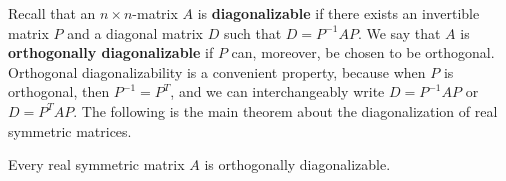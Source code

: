 \documentclass{ximera}
\begin{document}
Recall that an $n\times n$-matrix $A$ is \textbf{diagonalizable} if there exists an invertible matrix $P$
and a diagonal matrix $D$ such that $D = P^{-1}AP$. We say that $A$ is \textbf{orthogonally diagonalizable} if $P$ can, moreover, be
chosen to be orthogonal. Orthogonal diagonalizability is a convenient
property, because when $P$ is orthogonal, then $P^{-1}=P^T$, and we
can interchangeably write $D = P^{-1}AP$ or $D = P^TAP$.  The
following is the main theorem about the diagonalization of real
symmetric matrices.

\begin{theorem}\label{th:diagonalization-symmetric}
  Every real symmetric matrix $A$ is orthogonally diagonalizable.
\end{theorem}
\end{document}
